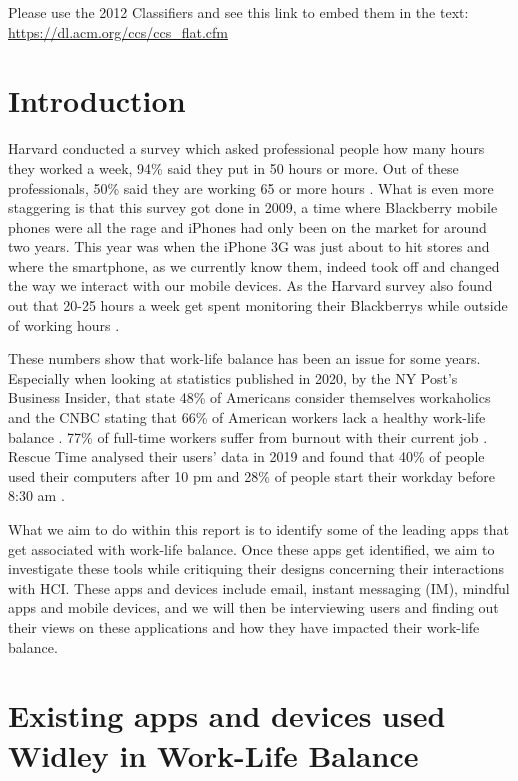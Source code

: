\documentclass{sigchi}
\begin{document}
\printccsdesc
Please use the 2012 Classifiers and see this link to embed them in the text: \url{https://dl.acm.org/ccs/ccs_flat.cfm}



\section{Introduction}
	Harvard conducted a survey which asked professional people how many hours they worked a week, 94\% said they put in 50 hours or more. Out of these professionals, 50\% said they are working 65 or more hours \cite{harvard_review}. What is even more staggering is that this survey got done in 2009, a time where Blackberry mobile phones were all the rage and iPhones had only been on the market for around two years. This year was when the iPhone 3G was just about to hit stores and where the smartphone, as we currently know them, indeed took off and changed the way we interact with our mobile devices. As the Harvard survey also found out that 20-25 hours a week get spent monitoring their Blackberrys while outside of working hours \cite{harvard_review}.   
	
	These numbers show that work-life balance has been an issue for some years. Especially when looking at statistics published in 2020, by the NY Post's Business Insider, that state 48\% of Americans consider themselves workaholics and the CNBC stating that 66\% of American workers lack a healthy work-life balance \cite{work-life_2020}. 77\% of full-time workers suffer from burnout with their current job \cite{work-life_2020}. Rescue Time analysed their users' data in 2019 and found that 40\% of people used their computers after 10 pm and 28\% of people start their workday before 8:30 am \cite{rescuetime_study}.  
	
	What we aim to do within this report is to identify some of the leading apps that get associated with work-life balance. Once these apps get identified, we aim to investigate these tools while critiquing their designs concerning their interactions with HCI. These apps and devices include email, instant messaging (IM), mindful apps and mobile devices, and we will then be interviewing users and finding out their views on these applications and how they have impacted their work-life balance.
	
	  

\section{Existing apps and devices used Widley in Work-Life Balance}
	
\end{document}
